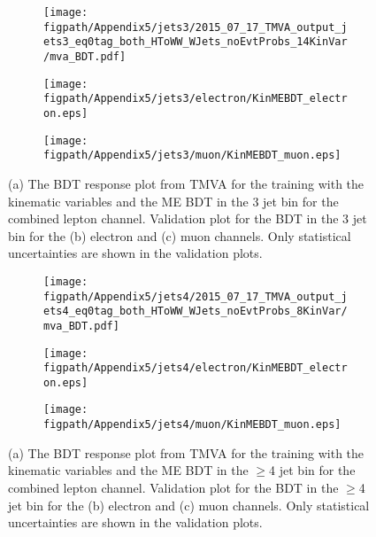 \begin{figure}[!hbt]
    \centering
    \begin{subfigure}[t]{0.317\textwidth}
        \texttt{[image: \\figpath/Appendix5/jets3/2015\_07\_17\_TMVA\_output\_jets3\_eq0tag\_both\_HToWW\_WJets\_noEvtProbs\_14KinVar/mva\_BDT.pdf]}
        \caption{}
        \label{fig:KinMEBDT_Response_3j0B_TMVA}
    \end{subfigure}
    \begin{subfigure}[t]{0.317\textwidth}
        \texttt{[image: \\figpath/Appendix5/jets3/electron/KinMEBDT\_electron.eps]}
        \caption{}
        \label{fig:KinMEBDT_jets3_electron_noSys}
    \end{subfigure}
    \begin{subfigure}[t]{0.317\textwidth}
        \texttt{[image: \\figpath/Appendix5/jets3/muon/KinMEBDT\_muon.eps]}
        \caption{}
        \label{fig:KinMEBDT_jets3_muon_noSys}
    \end{subfigure}
    \caption{(a) The BDT response plot from TMVA for the training with the kinematic variables and the ME BDT in the 3 jet bin for the combined lepton channel. Validation plot for the BDT in the 3 jet bin for the (b) electron and (c) muon channels. Only statistical uncertainties are shown in the validation plots.}
    \label{fig:KinMEBDT_Comparison_jets2}
\end{figure}

\begin{figure}[!hbt]
    \centering
    \begin{subfigure}[t]{0.317\textwidth}
        \texttt{[image: \\figpath/Appendix5/jets4/2015\_07\_17\_TMVA\_output\_jets4\_eq0tag\_both\_HToWW\_WJets\_noEvtProbs\_8KinVar/mva\_BDT.pdf]}
        \caption{}
        \label{fig:KinMEBDT_Response_4j0B_TMVA}
    \end{subfigure}
    \begin{subfigure}[t]{0.317\textwidth}
        \texttt{[image: \\figpath/Appendix5/jets4/electron/KinMEBDT\_electron.eps]}
        \caption{}
        \label{fig:KinMEBDT_jets4_electron_noSys}
    \end{subfigure}
    \begin{subfigure}[t]{0.317\textwidth}
        \texttt{[image: \\figpath/Appendix5/jets4/muon/KinMEBDT\_muon.eps]}
        \caption{}
        \label{fig:KinMEBDT_jets4_muon_noSys}
    \end{subfigure}
    \caption{(a) The BDT response plot from TMVA for the training with the kinematic variables and the ME BDT in the $\geqslant$4 jet bin for the combined lepton channel. Validation plot for the BDT in the $\geqslant$4 jet bin for the (b) electron and (c) muon channels. Only statistical uncertainties are shown in the validation plots.}
    \label{fig:KinMEBDT_Comparison_jets2}
\end{figure}
\clearpage







